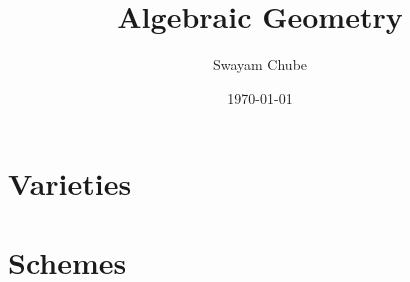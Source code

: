 \documentclass{report}
\title{Algebraic Geometry}
\author{Swayam Chube}
\date{\today}
\begin{document}
\maketitle
\tableofcontents

\chapter{Varieties}


\chapter{Schemes}

\end{document}
